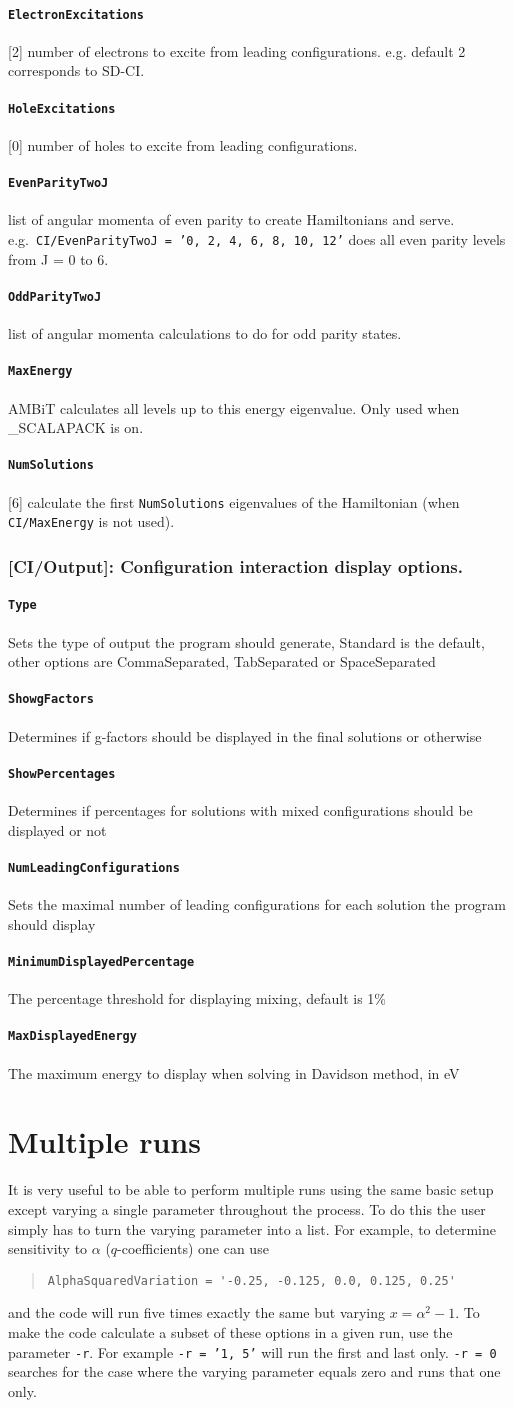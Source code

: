 \documentclass[a4paper,11pt]{article}
\newcommand{\option}[1]{\paragraph{\texttt{#1}}}
\begin{document}
\option{ElectronExcitations} [2] number of electrons to excite from leading configurations. e.g. default 2 corresponds to SD-CI.
\option{HoleExcitations} [0] number of holes to excite from leading configurations.

\option{EvenParityTwoJ} list of angular momenta of even parity to create Hamiltonians and serve. e.g.~\texttt{CI/EvenParityTwoJ = '0, 2, 4, 6, 8, 10, 12'} does all even parity levels from J = 0 to 6.

\option{OddParityTwoJ} list of angular momenta calculations to do for odd parity states.

\option{MaxEnergy} AMBiT calculates all levels up to this energy eigenvalue. Only used when \_SCALAPACK is on.
\option{NumSolutions} [6] calculate the first \texttt{NumSolutions} eigenvalues of the Hamiltonian (when \texttt{CI/MaxEnergy} is not used).

\subsubsection{[CI/Output]: Configuration interaction display options.}

\option{Type} Sets the type of output the program should generate, Standard is the default, other options are CommaSeparated, TabSeparated or SpaceSeparated
\option{ShowgFactors} Determines if g-factors should be displayed in the final solutions or otherwise
\option{ShowPercentages} Determines if percentages for solutions with mixed configurations should be displayed or not
\option{NumLeadingConfigurations} Sets the maximal number of leading configurations for each solution the program should display
\option{MinimumDisplayedPercentage} The percentage threshold for displaying mixing, default is 1\%
\option{MaxDisplayedEnergy} The maximum energy to display when solving in Davidson method, in eV

\section{Multiple runs}

It is very useful to be able to perform multiple runs using the same basic setup except varying a single parameter throughout the process. To do this the user simply has to turn the varying parameter into a list. For example, to determine sensitivity to $\alpha$ ($q$-coefficients) one can use
\begin{quote}
\begin{verbatim}
AlphaSquaredVariation = '-0.25, -0.125, 0.0, 0.125, 0.25'
\end{verbatim}
\end{quote}
and the code will run five times exactly the same but varying $x = \alpha^2 - 1$. To make the code calculate a subset of these options in a given run, use the parameter \texttt{-r}. For example \texttt{-r = '1, 5'} will run the first and last only. \texttt{-r = 0} searches for the case where the varying parameter equals zero and runs that one only.
\end{document}

